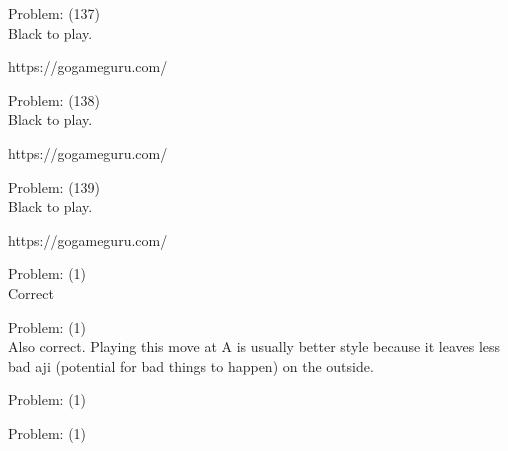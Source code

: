 \documentclass[11pt]{article}
\begin{document}
\begin{minipage}[t]{0.5\textwidth}
  {\centering
  
  Problem: (137)\\
  Black to play.

https://gogameguru.com/\\
  }
\end{minipage}
\begin{minipage}[t]{0.5\textwidth}
  {\centering
  
  Problem: (138)\\
  Black to play.

https://gogameguru.com/\\
  }
\end{minipage}
\begin{minipage}[t]{0.5\textwidth}
  {\centering
  
  Problem: (139)\\
  Black to play.

https://gogameguru.com/\\
  }
\end{minipage}
\begin{minipage}[t]{0.5\textwidth}
  {\centering
  
  Problem: (1)\\
  Correct\\
  }
\end{minipage}
\begin{minipage}[t]{0.5\textwidth}
  {\centering
  
  Problem: (1)\\
  Also correct. Playing this move at A is usually better style because it leaves less bad aji (potential for bad things to happen) on the outside.\\
  }
\end{minipage}
\begin{minipage}[t]{0.5\textwidth}
  {\centering
  
  Problem: (1)\\
  
  }
\end{minipage}
\begin{minipage}[t]{0.5\textwidth}
  {\centering
  
  Problem: (1)\\
  
  }
\end{minipage}
\end{document}
